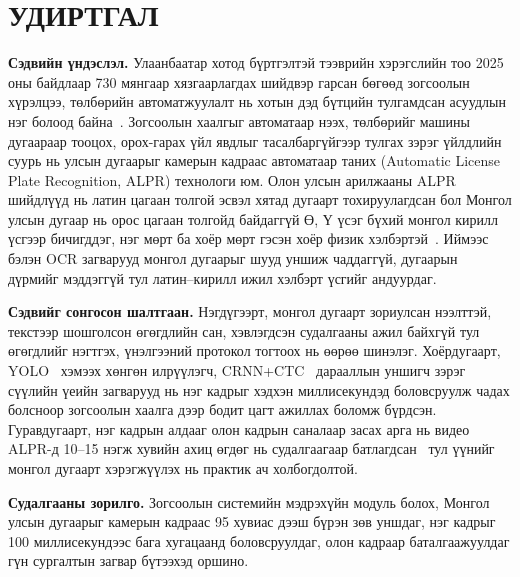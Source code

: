 \chapter*{УДИРТГАЛ}
\textbf{Сэдвийн үндэслэл.} Улаанбаатар хотод бүртгэлтэй тээврийн хэрэгслийн тоо 2025 оны байдлаар 730 мянгаар хязгаарлагдах шийдвэр гарсан бөгөөд зогсоолын хүрэлцээ, төлбөрийн автоматжуулалт нь хотын дэд бүтцийн тулгамдсан асуудлын нэг болоод байна~\cite{asianews2025}. Зогсоолын хаалгыг автоматаар нээх, төлбөрийг машины дугаараар тооцох, орох-гарах үйл явдлыг тасалбаргүйгээр тулгах зэрэг үйлдлийн суурь нь улсын дугаарыг камерын кадраас автоматаар таних (Automatic License Plate Recognition, ALPR) технологи юм. Олон улсын арилжааны ALPR шийдлүүд нь латин цагаан толгой эсвэл хятад дугаарт тохируулагдсан бол Монгол улсын дугаар нь орос цагаан толгойд байдаггүй Ө, Ү үсэг бүхий монгол кирилл үсгээр бичигддэг, нэг мөрт ба хоёр мөрт гэсэн хоёр физик хэлбэртэй~\cite{wikimn}. Иймээс бэлэн OCR загварууд монгол дугаарыг шууд уншиж чаддаггүй, дугаарын дүрмийг мэддэггүй тул латин--кирилл ижил хэлбэрт үсгийг андуурдаг.

\textbf{Сэдвийг сонгосон шалтгаан.} Нэгдүгээрт, монгол дугаарт зориулсан нээлттэй, текстээр шошголсон өгөгдлийн сан, хэвлэгдсэн судалгааны ажил байхгүй тул өгөгдлийг нэгтгэх, үнэлгээний протокол тогтоох нь өөрөө шинэлэг. Хоёрдугаарт, YOLO~\cite{yolo11} хэмээх хөнгөн илрүүлэгч, CRNN+CTC~\cite{shi2017crnn,graves2006ctc} дарааллын уншигч зэрэг сүүлийн үеийн загварууд нь нэг кадрыг хэдхэн миллисекундэд боловсруулж чадах болсноор зогсоолын хаалга дээр бодит цагт ажиллах боломж бүрдсэн. Гуравдугаарт, нэг кадрын алдааг олон кадрын саналаар засах арга нь видео ALPR-д 10--15 нэгж хувийн ахиц өгдөг нь судалгаагаар батлагдсан~\cite{laroca2018,wang2026mt} тул үүнийг монгол дугаарт хэрэгжүүлэх нь практик ач холбогдолтой.

\textbf{Судалгааны зорилго.} Зогсоолын системийн мэдрэхүйн модуль болох, Монгол улсын дугаарыг камерын кадраас 95 хувиас дээш бүрэн зөв уншдаг, нэг кадрыг 100 миллисекундээс бага хугацаанд боловсруулдаг, олон кадраар баталгаажуулдаг гүн сургалтын загвар бүтээхэд оршино.

